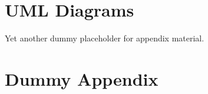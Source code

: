 \chapter{UML Diagrams}

Yet another dummy placeholder for appendix material.

\chapter{Dummy Appendix}